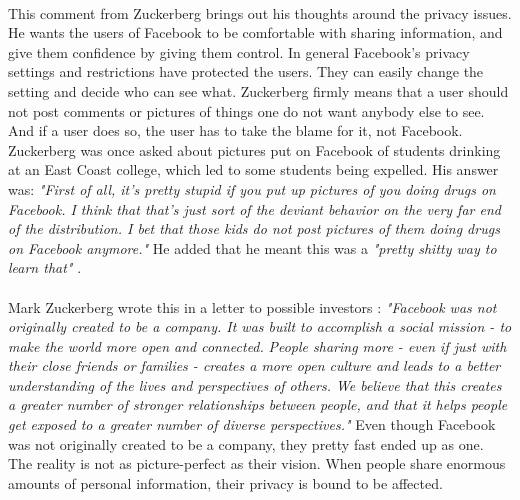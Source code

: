 \paragraph{}
This comment from Zuckerberg brings out his thoughts around the privacy issues. He wants the users of Facebook to be comfortable with sharing information, and give them confidence by giving them control. In general Facebook's privacy settings and restrictions have protected the users. They can easily change the setting and decide who can see what. Zuckerberg firmly means that a user should not post comments or pictures of things one do not want anybody else to see. And if a user does so, the user has to take the blame for it, not Facebook. Zuckerberg was once asked about pictures put on Facebook of students drinking at an East Coast college, which led to some students being expelled. His answer was: \textit{"First of all, it's pretty stupid if you put up pictures of you doing drugs on Facebook. I think that that's just sort of the deviant behavior on the very far end of the distribution. I bet that those kids do not post pictures of them doing drugs on Facebook anymore."} He added that he meant this was a \textit{"pretty shitty way to learn that"} \cite{MeMedia}.

\paragraph{}
Mark Zuckerberg wrote this in a letter to possible investors \cite{LetterToInvestors}: \textit{"Facebook was not originally created to be a company. It was built to accomplish a social mission - to make the world more open and connected.} \textit{People sharing more - even if just with their close friends or families - creates a more open culture and leads to a better understanding of the lives and perspectives of others. We believe that this creates a greater number of stronger relationships between people, and that it helps people get exposed to a greater number of diverse perspectives."} Even though Facebook was not originally created to be a company, they pretty fast ended up as one. The reality is not as picture-perfect as their vision. When people share enormous amounts of personal information, their privacy is bound to be affected. 